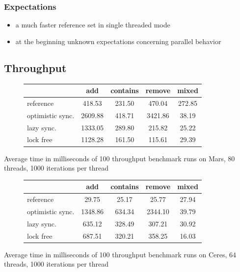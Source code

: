 \begin{frame}
\frametitle{Expectations}
\begin{itemize}
	\item a much faster reference set in single threaded mode
    \item at the beginning unknown expectations concerning parallel behavior 
\end{itemize}
\end{frame}

\subsection{Throughput}
\begin{frame}
\begin{figure}[H]
  \centering
\begin{tabular}{ l | c c c c }
 & add & contains & remove & mixed\\
 \hline
reference & 418.53 &  231.50 &  470.04  & 272.85\\
optimistic sync. & 2609.88  & 418.71 & 3421.86 &   38.19\\
lazy sync. & 1333.05 &  289.80 &  215.82  &  25.22\\
lock free & 1128.28  & 161.50  & 115.61   & 29.39\\
\end{tabular}
\end{figure}
Average time in milliseconds of 100 throughput benchmark runs on Mars, 80 threads, 1000 iterations per thread

\begin{figure}[H]
  \centering
\begin{tabular}{ l | c c c c }
 & add & contains & remove & mixed\\
 \hline
reference & 29.75  &  25.17  &  25.77 &   27.94 \\
optimistic sync. & 1348.86 &  634.34 & 2344.10  &  39.79 \\
lazy sync. & 635.12  & 328.49 &  307.21  &  30.92 \\
lock free & 687.51  & 320.21 &  358.25  &  16.03\\
\end{tabular}
\end{figure}
Average time in milliseconds of 100 throughput benchmark runs on Ceres, 64 threads, 1000 iterations per thread
\end{frame}

